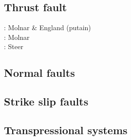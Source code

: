 \subsection{Thrust fault} 

\begin{scriptsize}
\nineteenninety: Molnar \& England \cite{moen90b} (putain)\\
\nineteenninetytwo: Molnar \cite{moln92} \\
\twothousandfourteen: Steer \etal \cite{stsc14}
\end{scriptsize}


\subsection{Normal faults} 


\textcite{heha05}
\textcite{hahe15}
\textcite{maha08}

\subsection{Strike slip faults} 


\textcite{tusp74}







\subsection{Transpressional systems} 

